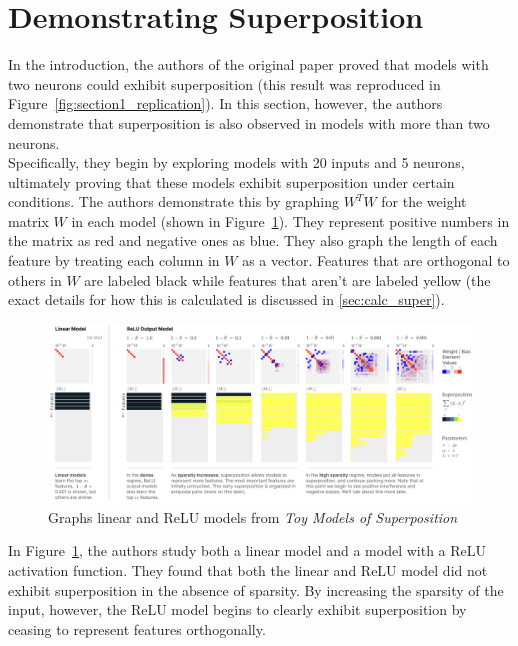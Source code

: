\documentclass{article} %
\begin{document}
\section{Demonstrating Superposition}

In the introduction, the authors of the original paper proved that models with 
two neurons could exhibit superposition (this result was reproduced in Figure~\ref{fig:section1_replication}).
In this section, however, the authors demonstrate that superposition
is also observed in models with more than two neurons. \\

Specifically, they begin by exploring models with 20 inputs and 5 neurons, 
ultimately proving that these models exhibit superposition under certain 
conditions. The authors demonstrate this by graphing $W^TW$ for the weight 
matrix $W$ in each model (shown in Figure~\ref{fig:section3_anthropic}). 
They represent positive numbers in the matrix as red and negative ones as blue. They also graph the length 
of each feature by treating each column in $W$ as a vector. Features that are 
orthogonal to others in $W$ are labeled black while features that aren't are labeled yellow
(the exact details for how this is calculated is discussed in \ref{sec:calc_super}).\\

\begin{figure}[h]
    \centering
    \includegraphics[width=0.9\linewidth]{demonstrating_superposition/images/anthropic_section3.png}
    \captionsetup{font=footnotesize} %
    \caption{Graphs linear and ReLU models from \textit{Toy Models of Superposition}\cite{elhage2022toy}}
    \label{fig:section3_anthropic}
\end{figure}

In Figure~\ref{fig:section3_anthropic}, the authors study both a linear model
and a model with a ReLU activation function. They found that both the linear
and ReLU model did not exhibit superposition in the absence of sparsity. By 
increasing the sparsity of the input, however, the ReLU model begins to clearly 
exhibit superposition by ceasing to represent features orthogonally.\\ 
\end{document}
